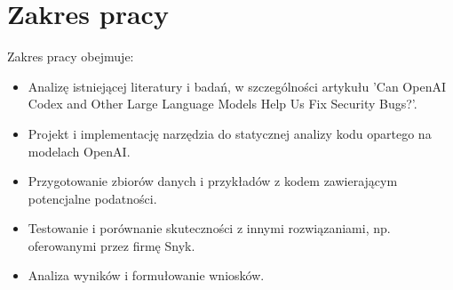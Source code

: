 \section*{Zakres pracy}
Zakres pracy obejmuje:
\begin{itemize}
    \item Analizę istniejącej literatury i badań, w szczególności artykułu 'Can OpenAI Codex and Other Large Language Models Help Us Fix Security Bugs?'.
    \item Projekt i implementację narzędzia do statycznej analizy kodu opartego na modelach OpenAI.
    \item Przygotowanie zbiorów danych i przykładów z kodem zawierającym potencjalne podatności.
    \item Testowanie i porównanie skuteczności z innymi rozwiązaniami, np. oferowanymi przez firmę Snyk.
    \item Analiza wyników i formułowanie wniosków.
\end{itemize}